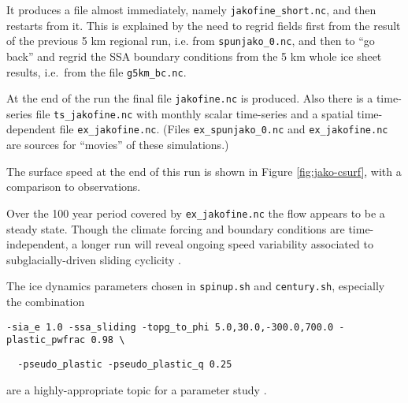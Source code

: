 It produces a file almost immediately, namely \verb|jakofine_short.nc|, and then restarts from it.  This is explained by the need to regrid fields first from the result of the previous 5 km regional run, i.e. from \verb|spunjako_0.nc|, and then to ``go back'' and regrid the SSA boundary conditions from the 5 km whole ice sheet results, i.e.~from the file \verb|g5km_bc.nc|.

At the end of the run the final file \verb|jakofine.nc| is produced.  Also there is a time-series file \verb|ts_jakofine.nc| with monthly scalar time-series and a spatial time-dependent file \verb|ex_jakofine.nc|.  (Files \verb|ex_spunjako_0.nc| and \verb|ex_jakofine.nc| are sources for ``movies'' of these simulations.)

The surface speed at the end of this run is shown in Figure \ref{fig:jako-csurf}, with a comparison to observations.

Over the 100 year period covered by \verb|ex_jakofine.nc| the flow appears to be a steady state.  Though the climate forcing and boundary conditions are time-independent, a longer run will reveal ongoing speed variability associated to subglacially-driven sliding cyclicity \cite{vanPeltOerlemans2012}.

The ice dynamics parameters chosen in \verb|spinup.sh| and \verb|century.sh|, especially the combination

  \verb|-sia_e 1.0 -ssa_sliding -topg_to_phi 5.0,30.0,-300.0,700.0 -plastic_pwfrac 0.98 \|

  \verb|  -pseudo_plastic -pseudo_plastic_q 0.25|
  
\noindent are a highly-appropriate topic for a parameter study \cite{BKAJS}.


\begin{comment}

\subsection*{Plotting the results}

This is about Figure {fig:jako-csurf}.  We use  PyPISMTools.

To visualize the surface speed at the end of the 2km run, download PyPISMTools and do

  basemap-plot.py --singlerow -v csurf -o csurf.png jakofine.nc

To choose a colormap add option \verb|--colormap foo.cpt| or similar; some colormaps can 

  cp Greenland_5km_v1.1.nc gr5km_xy.nc
  ncrename -v x1,x -v y1,y gr5km_xy.nc 
  ncrename -d x1,x -d y1,y gr5km_xy.nc 
  ncks -d x,55,175 -d y,195,280 -v lat,lon,mapping,surfvelmag gr5km_xy.nc foo.nc
  basemap-plot.py --singlerow -v surfvelmag -o surfvelmag.png foo.nc

\end{comment}